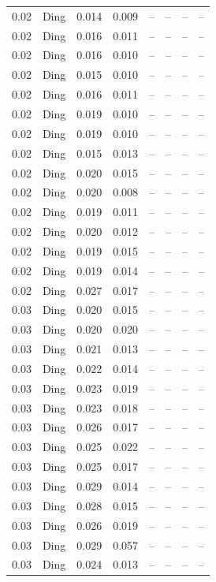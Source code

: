 \begin{table}[H]
\begin{tabular}{l c l l l}
0.02 & Ding & 0.014 & 0.009 & -- & -- & -- & -- \\
0.02 & Ding & 0.016 & 0.011 & -- & -- & -- & -- \\
0.02 & Ding & 0.016 & 0.010 & -- & -- & -- & -- \\
0.02 & Ding & 0.015 & 0.010 & -- & -- & -- & -- \\
0.02 & Ding & 0.016 & 0.011 & -- & -- & -- & -- \\
0.02 & Ding & 0.019 & 0.010 & -- & -- & -- & -- \\
0.02 & Ding & 0.019 & 0.010 & -- & -- & -- & -- \\
0.02 & Ding & 0.015 & 0.013 & -- & -- & -- & -- \\
0.02 & Ding & 0.020 & 0.015 & -- & -- & -- & -- \\
0.02 & Ding & 0.020 & 0.008 & -- & -- & -- & -- \\
0.02 & Ding & 0.019 & 0.011 & -- & -- & -- & -- \\
0.02 & Ding & 0.020 & 0.012 & -- & -- & -- & -- \\
0.02 & Ding & 0.019 & 0.015 & -- & -- & -- & -- \\
0.02 & Ding & 0.019 & 0.014 & -- & -- & -- & -- \\
0.02 & Ding & 0.027 & 0.017 & -- & -- & -- & -- \\
0.03 & Ding & 0.020 & 0.015 & -- & -- & -- & -- \\
0.03 & Ding & 0.020 & 0.020 & -- & -- & -- & -- \\
0.03 & Ding & 0.021 & 0.013 & -- & -- & -- & -- \\
0.03 & Ding & 0.022 & 0.014 & -- & -- & -- & -- \\
0.03 & Ding & 0.023 & 0.019 & -- & -- & -- & -- \\
0.03 & Ding & 0.023 & 0.018 & -- & -- & -- & -- \\
0.03 & Ding & 0.026 & 0.017 & -- & -- & -- & -- \\
0.03 & Ding & 0.025 & 0.022 & -- & -- & -- & -- \\
0.03 & Ding & 0.025 & 0.017 & -- & -- & -- & -- \\
0.03 & Ding & 0.029 & 0.014 & -- & -- & -- & -- \\
0.03 & Ding & 0.028 & 0.015 & -- & -- & -- & -- \\
0.03 & Ding & 0.026 & 0.019 & -- & -- & -- & -- \\
0.03 & Ding & 0.029 & 0.057 & -- & -- & -- & -- \\
0.03 & Ding & 0.024 & 0.013 & -- & -- & -- & -- \\

\end{tabular}
\end{table}
